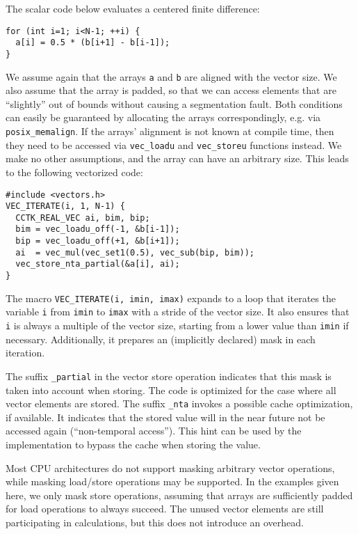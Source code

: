 \documentclass[conference]{IEEEtran}
\begin{document}
The scalar code below evaluates a centered finite difference:

\begin{small}
\begin{verbatim}
for (int i=1; i<N-1; ++i) {
  a[i] = 0.5 * (b[i+1] - b[i-1]);
}
\end{verbatim}
\end{small}

\noindent We assume again that the arrays \verb+a+ and \verb+b+ are
aligned with the vector size. We also assume that the array is padded,
so that we can access elements that are ``slightly'' out of bounds
without causing a segmentation fault. Both conditions can easily be
guaranteed by allocating the arrays correspondingly, e.g. via
\verb+posix_memalign+. If the arrays' alignment is not known at
compile time, then they need to be accessed via \verb+vec_loadu+ and
\verb+vec_storeu+ functions instead. We make no other assumptions, and
the array can have an arbitrary size. This leads to the following
vectorized code:

\begin{small}
\begin{verbatim}
#include <vectors.h>
VEC_ITERATE(i, 1, N-1) {
  CCTK_REAL_VEC ai, bim, bip;
  bim = vec_loadu_off(-1, &b[i-1]);
  bip = vec_loadu_off(+1, &b[i+1]);
  ai  = vec_mul(vec_set1(0.5), vec_sub(bip, bim));
  vec_store_nta_partial(&a[i], ai);
}
\end{verbatim}
\end{small}

\noindent The macro \verb+VEC_ITERATE(i, imin, imax)+
expands to a loop that iterates
the variable \verb+i+ from \verb+imin+ to \verb+imax+ with a stride of
the vector size. It also ensures that \verb+i+ is always a multiple of
the vector size, starting from a lower value than \verb+imin+ if
necessary. Additionally, it prepares an
(implicitly declared) mask in each iteration.

The suffix \verb+_partial+ in the vector
store operation indicates that this mask is taken into account when
storing. The
code is optimized for the case where all vector elements are stored.
The suffix \verb+_nta+ invokes a possible cache optimization, if
available. It indicates that the stored value will in the near future
not be accessed again (``non-temporal access'').
This hint can be used by the implementation to
bypass the cache when storing the value.

Most CPU architectures do not support masking arbitrary vector
operations, while masking load/store operations may be supported. In
the examples given here, we only mask store operations, assuming that
arrays are sufficiently padded for load operations to always succeed. The
unused vector elements are still participating in calculations, but
this does not introduce an overhead.
\end{document}
